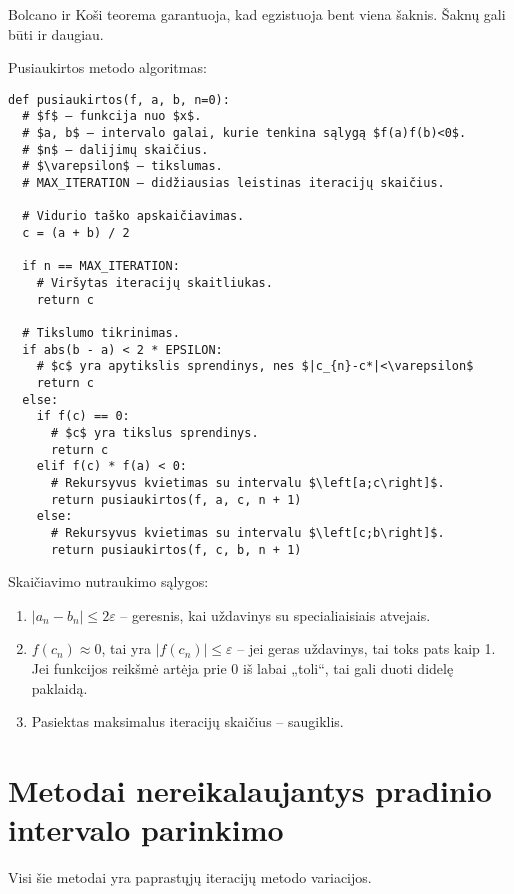 \begin{note}
  Bolcano ir Koši teorema garantuoja, kad egzistuoja bent viena
  šaknis. Šaknų gali būti ir daugiau.
\end{note}


Pusiaukirtos metodo algoritmas:
\begin{verbatim}
def pusiaukirtos(f, a, b, n=0):
  # $f$ – funkcija nuo $x$.
  # $a, b$ – intervalo galai, kurie tenkina sąlygą $f(a)f(b)<0$.
  # $n$ – dalijimų skaičius.
  # $\varepsilon$ – tikslumas.
  # MAX_ITERATION – didžiausias leistinas iteracijų skaičius.

  # Vidurio taško apskaičiavimas.
  c = (a + b) / 2

  if n == MAX_ITERATION:
    # Viršytas iteracijų skaitliukas.
    return c

  # Tikslumo tikrinimas.
  if abs(b - a) < 2 * EPSILON:
    # $c$ yra apytikslis sprendinys, nes $|c_{n}-c*|<\varepsilon$ 
    return c
  else:
    if f(c) == 0:
      # $c$ yra tikslus sprendinys.
      return c
    elif f(c) * f(a) < 0:
      # Rekursyvus kvietimas su intervalu $\left[a;c\right]$.
      return pusiaukirtos(f, a, c, n + 1)
    else:
      # Rekursyvus kvietimas su intervalu $\left[c;b\right]$.
      return pusiaukirtos(f, c, b, n + 1)
\end{verbatim}

Skaičiavimo nutraukimo sąlygos:
\begin{enumerate}
  \item $|a_{n} - b_{n}| \leq 2\varepsilon$ – geresnis, kai uždavinys
    su specialiaisiais atvejais.
  \item $f(c_{n}) \approx 0$, tai yra $|f(c_{n})| \leq \varepsilon$
    – jei geras uždavinys, tai toks pats kaip 1. Jei funkcijos reikšmė
    artėja prie 0 iš labai „toli“, tai gali duoti didelę paklaidą.
  \item Pasiektas maksimalus iteracijų skaičius – saugiklis.
\end{enumerate}

\section{Metodai nereikalaujantys pradinio intervalo parinkimo}


Visi šie metodai yra paprastųjų iteracijų metodo variacijos.

